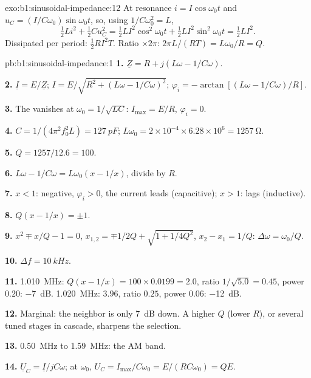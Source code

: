\begin{solution}{exo:b1:sinusoidal-impedance:12}
At resonance $i = I\cos\omega_0 t$ and $u_C = (I/C\omega_0)\sin\omega_0 t$,
so, using $1/C\omega_0^2 = L$,
\[
\tfrac12 Li^2 + \tfrac12 Cu_C^2 = \tfrac12 LI^2\cos^2\omega_0 t
+ \tfrac12 LI^2\sin^2\omega_0 t = \tfrac12 LI^2 .
\]
Dissipated per period: $\tfrac12 RI^2T$. Ratio $\times 2\pi$: $2\pi L/(RT)
= L\omega_0/R = Q$.
\end{solution}

\begin{solution}{pb:b1:sinusoidal-impedance:1}
\textbf{1.} $\underline Z = R + j(L\omega - 1/C\omega)$.

\textbf{2.} $\underline I = E/\underline Z$; $I = E/\sqrt{R^2 + (L\omega -
1/C\omega)^2}$; $\varphi_i = -\arctan[(L\omega - 1/C\omega)/R]$.

\textbf{3.} The  vanishes at $\omega_0 = 1/\sqrt{LC}$: $I_{\max}
= E/R$, $\varphi_i = 0$.

\textbf{4.} $C = 1/(4\pi^2f_0^2L) = \qty{127}{pF}$; $L\omega_0 = 2\times10^{-4}
\times 6.28\times10^6 = \qty{1257}{\ohm}$.

\textbf{5.} $Q = 1257/12.6 = 100$.

\textbf{6.} $L\omega - 1/C\omega = L\omega_0(x - 1/x)$, divide by $R$.

\textbf{7.} $x < 1$:  negative, $\varphi_i > 0$, the current
leads (capacitive); $x > 1$: lags (inductive).

\textbf{8.} $Q(x - 1/x) = \pm1$.

\textbf{9.} $x^2 \mp x/Q - 1 = 0$, $x_{1,2} = \mp1/2Q + \sqrt{1 + 1/4Q^2}$,
$x_2 - x_1 = 1/Q$: $\Delta\omega = \omega_0/Q$.

\textbf{10.} $\Delta f = \qty{10}{kHz}$.

\textbf{11.} \qty{1.010}{MHz}: $Q(x - 1/x) = 100 \times 0.0199 = 2.0$,
ratio $1/\sqrt{5.0} = 0.45$, power $0.20$: \qty{-7}{dB}. \qty{1.020}{MHz}:
$3.96$, ratio $0.25$, power $0.06$: \qty{-12}{dB}.

\textbf{12.} Marginal: the neighbor is only \qty{7}{dB} down. A higher
$Q$ (lower $R$), or several tuned stages in cascade, sharpens the
selection.

\textbf{13.} \qty{0.50}{MHz} to \qty{1.59}{MHz}: the AM band.

\textbf{14.} $\underline U_C = \underline I/jC\omega$; at $\omega_0$,
$U_C = I_{\max}/C\omega_0 = E/(RC\omega_0) = QE$.


\end{solution}
